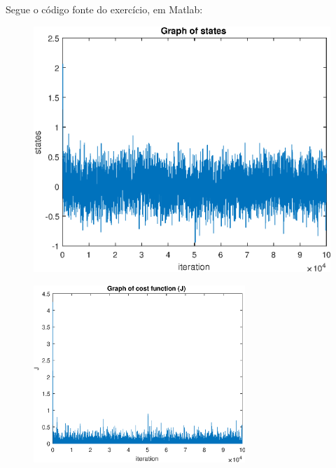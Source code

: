 \documentclass[12pt]{article}
\newenvironment{exercise}[2][Exercício]{\begin{trivlist}
\item[\hskip \labelsep {\bfseries #1}\hskip \labelsep {\bfseries #2.}]}{\end{trivlist}}
\begin{document}
\begin{exercise}{3.a}

Segue o código fonte do exercício, em Matlab:



\begin{figure}[H]
  \centering
  \includegraphics[width=12cm]{figs/ex3_states.eps} 
\end{figure}

\begin{figure}[H]
  \centering
  \includegraphics[width=8cm]{figs/ex3_j.eps} 
\end{figure}
\end{exercise}
\end{document}
